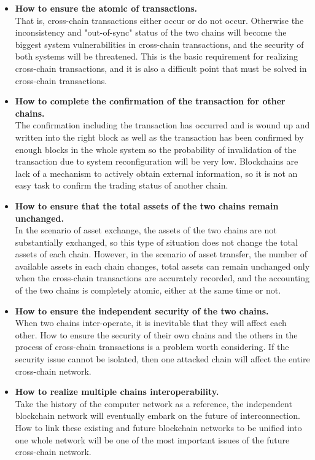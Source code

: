 \begin{itemize}
    \item \textbf{How to ensure the atomic of transactions.}\\
    That is, cross-chain transactions either occur or do not occur. Otherwise the inconsistency and "out-of-sync" status of the two chains will become the biggest system vulnerabilities in cross-chain transactions, and the security of both systems will be threatened. This is the basic requirement for realizing cross-chain transactions, and it is also a difficult point that must be solved in cross-chain transactions.
    \item \textbf{How to complete the confirmation of the transaction for other chains.} \\
    The confirmation including the transaction has occurred and is wound up and written into the right block as well as the transaction has been confirmed by enough blocks in the whole system so the probability of invalidation of the transaction due to system reconfiguration will be very low. Blockchains are lack of a mechanism to actively obtain external information, so it is not an easy task to confirm the trading status of another chain.
    \item \textbf{How to ensure that the total assets of the two chains remain unchanged.} \\
    In the scenario of asset exchange, the assets of the two chains are not substantially exchanged, so this type of situation does not change the total assets of each chain. However, in the scenario of asset transfer, the number of available assets in each chain changes, total assets can remain unchanged only when the cross-chain transactions are accurately recorded, and the accounting of the two chains is completely atomic, either at the same time or not. 
    \item \textbf{How to ensure the independent security of the two chains.} \\
    When two chains inter-operate, it is inevitable that they will affect each other. How to ensure the security of their own chains and the others in the process of cross-chain transactions is a problem worth considering. If the security issue cannot be isolated, then one attacked chain will affect the entire cross-chain network.
    \item \textbf{How to realize multiple chains interoperability.} \\
    Take the history of the computer network as a reference, the independent blockchain network will eventually embark on the future of interconnection. How to link these existing and future blockchain networks to be unified into one whole network will be one of the most important issues of the future cross-chain network. 
\end{itemize}


